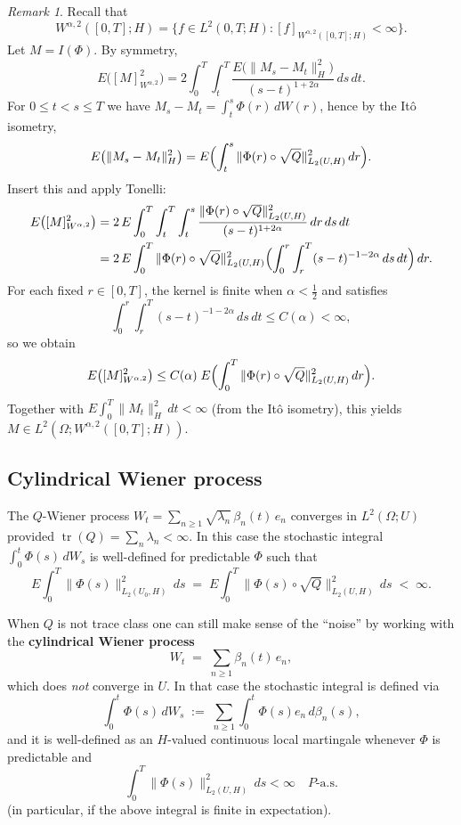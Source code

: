 \documentclass[11pt]{article}
\theoremstyle{definition}
\theoremstyle{remark}
\newtheorem{remark}{Remark}
\DeclareMathOperator{\tr}{tr}
\begin{document}
\begin{remark}
Recall that
\[
    W^{\alpha,2}([0,T];H)
    =
    \bigl\{f\in L^2(0,T;H): [f]_{W^{\alpha,2}([0,T];H)} < \infty\bigr\}.
\]
Let $M=I(\Phi)$.  By symmetry,
\[
    E\bigl([M]_{W^{\alpha,2}}^2\bigr)
    =
    2\int_0^T\int_t^T
    \frac{E\bigl(\|M_s-M_t\|_H^2\bigr)}{(s-t)^{1+2\alpha}}\,ds\,dt.
\]
For $0\le t<s\le T$ we have $M_s-M_t=\int_t^s \Phi(r)\,dW(r)$, hence by the It\^o isometry,
\[
    E\bigl(\|M_s-M_t\|_H^2\bigr)
    =
    E\Bigl(\int_t^s \|\Phi(r)\circ\sqrt{Q}\|_{L_2(U,H)}^2\,dr\Bigr).
\]
Insert this and apply Tonelli:
\begin{align*}
    E\bigl([M]_{W^{\alpha,2}}^2\bigr)
    &=
    2\,E\int_0^T\int_t^T\int_t^s
    \frac{\|\Phi(r)\circ\sqrt{Q}\|_{L_2(U,H)}^2}{(s-t)^{1+2\alpha}}\,dr\,ds\,dt \\
    &=
    2\,E\int_0^T \|\Phi(r)\circ\sqrt{Q}\|_{L_2(U,H)}^2
    \Bigl(\int_0^r\int_r^T (s-t)^{-1-2\alpha}\,ds\,dt\Bigr)\,dr.
\end{align*}
For each fixed $r\in[0,T]$, the kernel is finite when $\alpha<\tfrac12$ and satisfies
\[
    \int_0^r\int_r^T (s-t)^{-1-2\alpha}\,ds\,dt
    \le
    C(\alpha) < \infty,
\]
so we obtain
\[
    E\bigl([M]_{W^{\alpha,2}}^2\bigr)
    \le
    C(\alpha)\;E\Bigl(\int_0^T \|\Phi(r)\circ\sqrt{Q}\|_{L_2(U,H)}^2\,dr\Bigr).
\]
Together with $E\int_0^T \|M_t\|_H^2\,dt < \infty$ (from the It\^o isometry), this yields
$M\in L^2(\Omega;W^{\alpha,2}([0,T];H))$.
\end{remark}

\subsection*{Cylindrical Wiener process}

The $Q$-Wiener process
$W_t = \sum_{n\ge 1} \sqrt{\lambda_n}\,\beta_n(t)\,e_n$
converges in $L^2(\Omega;U)$ provided $\tr(Q) = \sum_n \lambda_n < \infty$.
In this case the stochastic integral
$\int_0^t \Phi(s)\,dW_s$ is well-defined for predictable $\Phi$ such that
\[
    E\int_0^T \|\Phi(s)\|_{L_2(U_0,H)}^2\,ds
    \;=\;
    E\int_0^T \|\Phi(s)\circ\sqrt{Q}\|_{L_2(U,H)}^2\,ds
    \;<\;\infty.
\]

When $Q$ is not trace class one can still make sense of the ``noise'' by working with the
\textbf{cylindrical Wiener process}
\[
    W_t
    \;=\;
    \sum_{n \ge 1} \beta_n(t)\,e_n,
\]
which does \emph{not} converge in $U$.  In that case the stochastic integral is defined via
\[
    \int_0^t \Phi(s)\,dW_s
    \;:=\;
    \sum_{n\ge 1}\int_0^t \Phi(s)e_n\,d\beta_n(s),
\]
and it is well-defined as an $H$-valued continuous local martingale whenever $\Phi$ is predictable and
\[
    \int_0^T \|\Phi(s)\|_{L_2(U,H)}^2\,ds < \infty \quad P\text{-a.s.}
\]
(in particular, if the above integral is finite in expectation).
\end{document}
